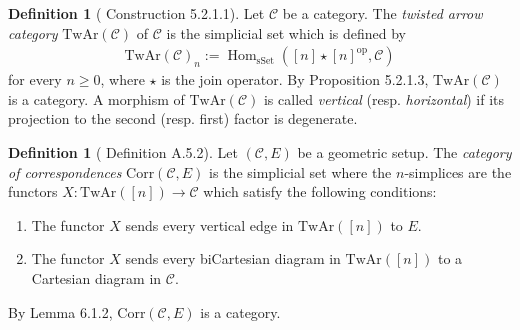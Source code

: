 \documentclass[a4paper,dvipdfmx,11pt,reqno]{amsart}
\DeclareMathOperator{\Hom}{Hom}
\DeclareMathOperator{\myop}{op}
\newcommand{\C}{\mathcal{C}}
\newcommand{\TwAr}{\mathrm{TwAr}}
\newcommand{\Corr}{\mathrm{Corr}}
\theoremstyle{definition}
\newtheorem{definition}[theorem]{Definition}
\begin{document}
\begin{definition}[\cite{HA} Construction 5.2.1.1]
  Let $\C$ be a category.
  The \textit{twisted arrow category} $\TwAr(\C)$ of $\C$ is the simplicial set which is defined by 
  \begin{align*}
    \TwAr(\C)_n := \Hom_{\mathrm{sSet}}([n] \star [n]^{\myop},\C)
  \end{align*}
  for every $n \geq 0$, where $\star$ is the join operator.
  By \cite{HA} Proposition 5.2.1.3, $\TwAr(\C)$ is a category.
  A morphism of $\TwAr(\C)$ is called \textit{vertical} (resp. \textit{horizontal}) if its projection to the second (resp. first) factor is degenerate.
\end{definition}

\begin{definition}[\cite{Mann22} Definition A.5.2] \label{Mann.def.A.5.2}
  Let $(\C,E)$ be a geometric setup.
  The \textit{category of correspondences} $\Corr(\C,E)$ is the simplicial set where the $n$-simplices are the functors $X : \TwAr([n]) \to \C$ which satisfy the following conditions:
  \begin{enumerate}
    \item The functor $X$ sends every vertical edge in $\TwAr([n])$ to $E$.
    \item  The functor $X$ sends every biCartesian diagram in $\TwAr([n])$ to a Cartesian diagram in $\C$.
  \end{enumerate}
  By \cite{LZ17} Lemma 6.1.2, $\Corr(\C,E)$ is a category.
\end{definition}
\end{document}
